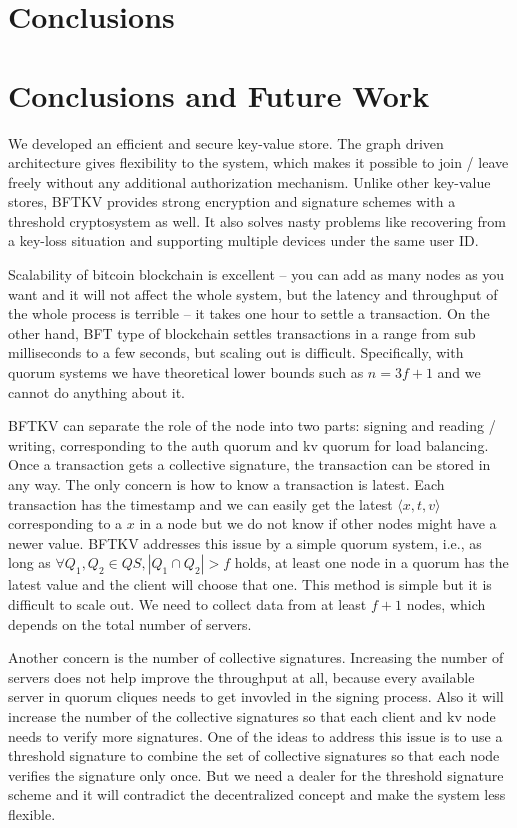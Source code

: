 \ifdefined\ABSTRACT
\section{Conclusions}
\else
\section{Conclusions and Future Work}
\fi
We developed an efficient and secure key-value store. The graph driven
architecture gives flexibility to the system, which makes it possible
to join / leave freely without any additional authorization
mechanism. Unlike other key-value stores, BFTKV provides strong
encryption and signature schemes with a threshold cryptosystem as
well. It also solves nasty problems like recovering from a key-loss
situation and supporting multiple devices under the same user ID.

\ifdefined\ABSTRACT
\else
Scalability of bitcoin blockchain is excellent -- you can add as many
nodes as you want and it will not affect the whole system, but the
latency and throughput of the whole process is terrible -- it takes
one hour to settle a transaction.
On the other hand, BFT type of blockchain settles transactions in a
range from sub milliseconds to a few seconds, but scaling out is
difficult. Specifically, with quorum systems we have theoretical lower
bounds such as $n = 3f + 1$ and we cannot do anything about it.

BFTKV can separate the role of the node into two parts: signing and
reading / writing, corresponding to the auth quorum and kv quorum for
load balancing.
Once a transaction gets a collective signature, the transaction
can be stored in any way. The only concern is how to know a
transaction is latest. Each transaction has the timestamp and we can
easily get the latest $\langle x, t, v \rangle$ corresponding to a $x$
in a node but we do not know if other nodes might have a newer
value. BFTKV addresses this issue by a simple quorum system, i.e., as
long as $\forall Q_1, Q_2 \in QS, |Q_1 \cap Q_2| > f$ holds, at least
one node in a quorum has the latest value and the client will choose
that one. This method is simple but it is difficult to scale out. We
need to collect data from at least $f+1$ nodes, which depends on the
total number of servers.

Another concern is the number of collective signatures. Increasing the
number of servers does not help improve the throughput at all, because
every available server in quorum cliques needs to get invovled in
the signing process. Also it will increase the number of the
collective signatures so that each client and kv node needs to verify
more signatures.
One of the ideas to address this issue is to use a threshold signature
to combine the set of collective signatures so that each node verifies
the signature only once. But we need a dealer for the threshold
signature scheme and it will contradict the decentralized concept and
make the system less flexible.
\fi
